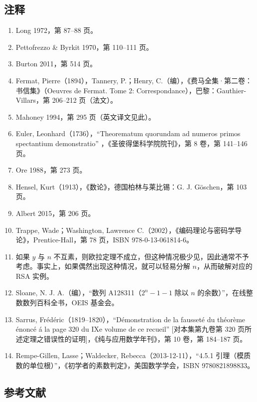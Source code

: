 \subsection{注释}
\begin{enumerate}
\item Long 1972，第 87–88 页。
\item Pettofrezzo & Byrkit 1970，第 110–111 页。
\item Burton 2011，第 514 页。
\item Fermat, Pierre（1894），Tannery, P.；Henry, C.（编），《费马全集·第二卷：书信集》（Oeuvres de Fermat. Tome 2: Correspondance），巴黎：Gauthier-Villars，第 206–212 页（法文）。
\item Mahoney 1994，第 295 页（英文译文见此）。
\item Euler, Leonhard（1736），“Theorematum quorundam ad numeros primos spectantium demonstratio” ，《圣彼得堡科学院院刊》，第 8 卷，第 141–146 页。
\item Ore 1988，第 273 页。
\item Hensel, Kurt（1913），《数论》，德国柏林与莱比锡：G. J. Göschen，第 103 页。
\item Albert 2015，第 206 页。
\item Trappe, Wade；Washington, Lawrence C.（2002），《编码理论与密码学导论》，Prentice-Hall，第 78 页，ISBN 978-0-13-061814-6。
\item 如果 $y$ 与 $n$ 不互素，则欧拉定理不成立，但这种情况极少见，因此通常不予考虑。事实上，如果偶然出现这种情况，就可以轻易分解 $n$，从而破解对应的 RSA 实例。
\item Sloane, N. J. A.（编），“数列 A128311（$2^n - 1 - 1$ 除以 $n$ 的余数）”，在线整数数列百科全书，OEIS 基金会。
\item Sarrus, Frédéric（1819–1820），“Démonstration de la fausseté du théorème énoncé á la page 320 du IXe volume de ce recueil” [对本集第九卷第 320 页所述定理之错误性的证明]，《纯与应用数学年刊》，第 10 卷，第 184–187 页。
\item Rempe-Gillen, Lasse；Waldecker, Rebecca（2013-12-11），“4.5.1 引理（模质数的单位根）”，《初学者的素数判定》，美国数学学会，ISBN 9780821898833。
\end{enumerate}
\subsection{参考文献}

